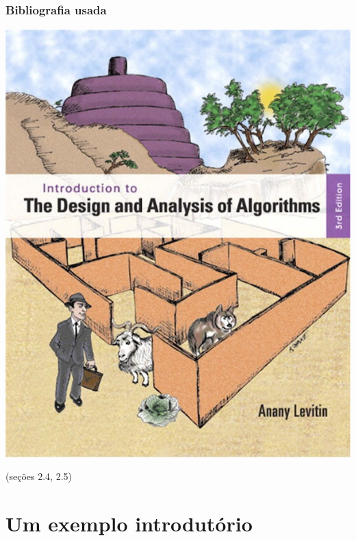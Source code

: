\documentclass[handout]{beamer}
\begin{document}
\begin{frame}

  \frametitle{Bibliografia usada}

  \begin{center}
    \includegraphics[height=.8\textheight]{../img/capa-levitin.jpg}
  \end{center}
  (seções 2.4, 2.5)
\end{frame}

\section{Um exemplo introdutório}
\end{document}
